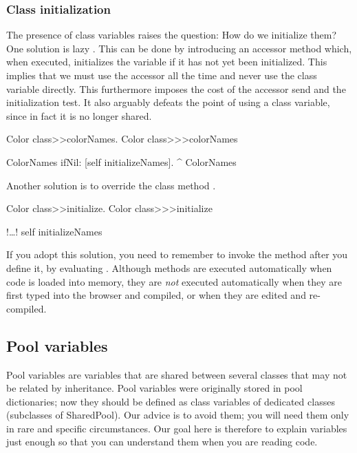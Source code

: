 \documentclass[a4paper,10pt,twoside]{book}
\begin{document}
\subsubsection{Class initialization}

The presence of class variables raises the question:
How do we initialize them?
One solution is lazy .
This can be done by introducing an accessor method which, when executed, initializes the variable if it has not yet been initialized.
This implies that we must use the accessor all the time and never use the class variable directly.
This furthermore imposes the cost of the accessor send and the initialization test.
It also arguably defeats the point of using a class variable, since in fact it is no longer shared.

\begin{method}[colorclasscolornames]{Color class>>colorNames.}
Color class>>>colorNames

	ColorNames ifNil: [self initializeNames].
	^ ColorNames
\end{method}

Another solution is to override the class method .

\begin{method}[colorclassinit]{Color class>>initialize.}
Color class>>>initialize

	!\ldots!
	self initializeNames
\end{method}

\noindent
If you adopt this solution, you need to remember to invoke the  method after you define it, \eg by evaluating .
Although   methods are executed automatically when code is loaded into memory, they are \emph{not} executed automatically when they are first typed into the browser and compiled, or when they are edited and re-compiled.

\subsection{Pool variables}
Pool variables are variables that are shared between several classes that may not be related by inheritance.
Pool variables were originally stored in pool dictionaries; now they should be defined as class variables of dedicated classes (subclasses of SharedPool).
Our advice is to avoid them; you will need them only in rare and specific circumstances.
Our goal here is therefore to explain  variables just enough so that you can understand them when you are reading code.
\end{document}
